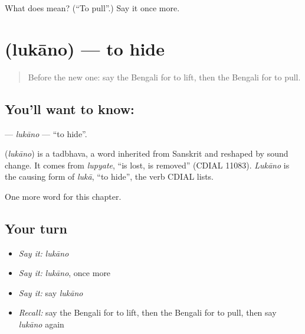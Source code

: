 \begin{tcolorbox}[breakable,colback=teal!4,colframe=teal!35!black,title={Before you move on}]
What does  mean? (\textquotedblleft{}To pull\textquotedblright{}.) Say it once more.
\end{tcolorbox}
\section[\texorpdfstring{\bn{লুকানো} (lukāno)}{লুকানো (lukāno)}]{ (lukāno) — to hide}

\label{lesson:BN-C54-lukano}



\begin{quote}
Before the new one: say the Bengali for to lift, then the Bengali for to pull.
\end{quote}

\subsection*{You'll want to know: }
\textbf{} — \emph{lukāno} — \textquotedblleft{}to hide\textquotedblright{}.

\begin{cousinweb}
\textbf{} (\emph{lukāno}) is a tadbhava, a word inherited from Sanskrit and reshaped by sound change. It comes from \emph{lupyate}, \textquotedblleft{}is lost, is removed\textquotedblright{} (CDIAL 11083). \emph{Lukāno} is the causing form of \emph{lukā}, \textquotedblleft{}to hide\textquotedblright{}, the verb CDIAL lists.
\end{cousinweb}

\begin{grammarlens}[title={What you've built}]
One more word for this chapter.
\end{grammarlens}

\subsection*{Your turn}
\begin{itemize}
\raggedright
  \item \emph{Say it:} \emph{lukāno}
  \item \emph{Say it:} \emph{lukāno}, once more
  \item \emph{Say it:} say \emph{lukāno}
  \item \emph{Recall:} say the Bengali for to lift, then the Bengali for to pull, then say \emph{lukāno} again
\end{itemize}

